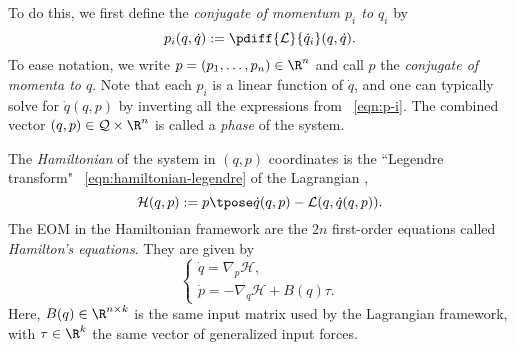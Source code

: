 To do this, we first define the \textit{conjugate of momentum \(p_i\) to \(q_i\)} by
\begin{equation}\label{eqn:p-i}
    p_i(q,\dot{q}) := \pdiff{\mathcal{L}}{\dot{q}_i}(q,\dot{q})
    .
\end{equation}
To ease notation, we write \(p = (p_1, \ldots, p_n) \in \R^n\) and call
\(p\) the \textit{conjugate of momenta to \(q\)}.
Note that each \(p_i\) is a linear function of \(\dot{q}\), and one can typically
solve for \(\dot{q}(q,p)\) by inverting all the expressions from ~\eqref{eqn:p-i}.
The combined vector \((q,p) \in \mathcal{Q}\times\R^n\) is called a 
\textit{phase} of the system. 

The \textit{Hamiltonian} of the system in
\((q,p)\) coordinates is the ``Legendre transform"
~\eqref{eqn:hamiltonian-legendre} of the Lagrangian \cite{landau_mechanics},
\begin{equation}\label{eqn:hamiltonian-legendre}
    \mathcal{H}(q,p) := p\tpose \dot{q}(q,p) - \mathcal{L}(q,\dot{q}(q,p))
    .
\end{equation}
The EOM in the Hamiltonian framework are the \(2n\)
first-order equations called \textit{Hamilton's equations}. They are given by
\begin{equation}\label{eqn:hamiltons-eqns}
    \begin{cases}
        \dot{q} = \nabla_p\mathcal{H} 
        , \\
        \dot{p} = -\nabla_q\mathcal{H} + B(q)\tau
        .
    \end{cases}
\end{equation}
Here, \(B(q) \in \R^{n\times k}\) is the same input matrix used by the
Lagrangian framework, with \(\tau \in \R^k\) the same vector of generalized
input forces.

